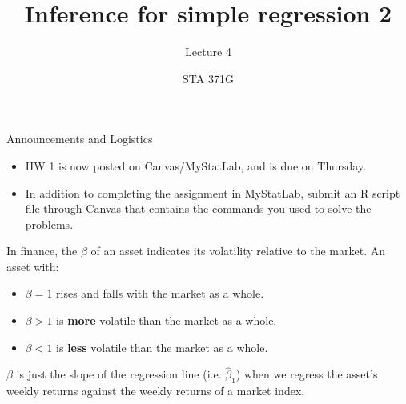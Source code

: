 \documentclass{beamer}\usepackage[]{graphicx}\usepackage[]{color}
\title{Inference for simple regression 2}
\subtitle{Lecture 4}
\author{STA 371G}
\makeatletter
\newcommand{\hlstr}[1]{\textcolor[rgb]{1,0.894,0.71}{#1}}%
\newcommand{\hlopt}[1]{\textcolor[rgb]{1,0.894,0.769}{#1}}%
\newcommand{\hlstd}[1]{\textcolor[rgb]{1,0.894,0.769}{#1}}%
\newcommand{\hlkwc}[1]{\textcolor[rgb]{0.78,0.941,0.545}{#1}}%
\newcommand{\hlkwd}[1]{\textcolor[rgb]{1,0.78,0.769}{#1}}%
\newenvironment{kframe}{%
 \def\at@end@of@kframe{}%
 \ifinner\ifhmode%
  \def\at@end@of@kframe{\end{minipage}}%
  \begin{minipage}{\columnwidth}%
 \fi\fi%
 \def\FrameCommand##1{\hskip\@totalleftmargin \hskip-\fboxsep
 \colorbox{shadecolor}{##1}\hskip-\fboxsep
     \hskip-\linewidth \hskip-\@totalleftmargin \hskip\columnwidth}%
 \MakeFramed {\advance\hsize-\width
   \@totalleftmargin\z@ \linewidth\hsize
   \@setminipage}}%
 {\par\unskip\endMakeFramed%
 \at@end@of@kframe}
\newenvironment{knitrout}{}{} %
\makeatother
\begin{document}
  
  
  

  \frame{\maketitle}



  \begin{darkframes}
    \begin{frame}{Announcements and Logistics}
      \begin{itemize}
        \item HW 1 is now posted on Canvas/MyStatLab, and is due on Thursday.
        \item In addition to completing the assignment in MyStatLab, submit an R script file through Canvas that contains the commands you used to solve the problems.
      \end{itemize}
    \end{frame}

    \begin{frame}
      In finance, the $\beta$ of an asset indicates its volatility relative to the market. An asset with:
      \pause
      \begin{itemize}[<+->]
        \item $\beta=1$ rises and falls with the market as a whole.
        \item $\beta>1$ is \textbf{more} volatile than the market as a whole.
        \item $\beta<1$ is \textbf{less} volatile than the market as a whole.
      \end{itemize}
      \pause
      $\beta$ is just the slope of the regression line (i.e. $\hat\beta_1$) when we regress the asset's weekly returns against the weekly returns of a market index.
    \end{frame}

\end{darkframes}
\end{document}
